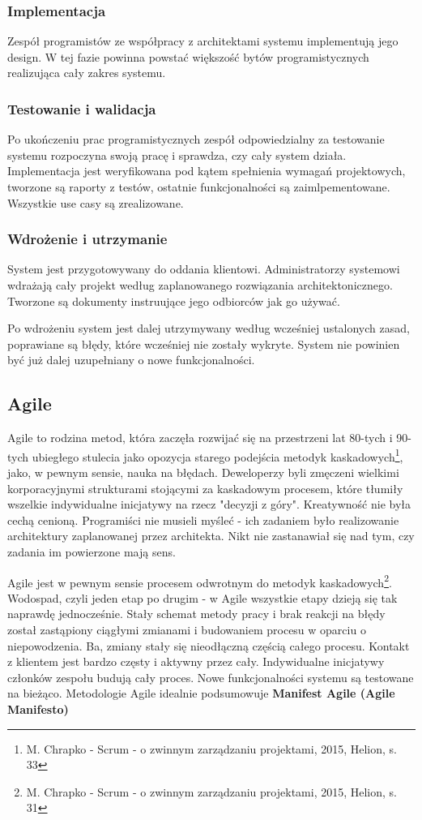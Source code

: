\documentclass{article}
\begin{document}
\subsubsection*{Implementacja}
Zespół programistów ze współpracy z architektami systemu implementują jego design. W tej fazie powinna powstać większość bytów programistycznych realizująca cały zakres systemu.

\subsubsection*{Testowanie i walidacja}
Po ukończeniu prac programistycznych zespół odpowiedzialny za testowanie systemu rozpoczyna swoją pracę i sprawdza, czy cały system działa. Implementacja jest weryfikowana pod kątem spełnienia wymagań projektowych, tworzone są raporty z testów, ostatnie funkcjonalności są zaimlpementowane. Wszystkie use casy są zrealizowane.

\subsubsection*{Wdrożenie i utrzymanie}
System jest przygotowywany do oddania klientowi. Administratorzy systemowi wdrażają cały projekt według zaplanowanego rozwiązania architektonicznego. Tworzone są dokumenty instruujące jego odbiorców jak go używać.

Po wdrożeniu system jest dalej utrzymywany według wcześniej ustalonych zasad, poprawiane są błędy, które wcześniej nie zostały wykryte. System nie powinien być już dalej uzupełniany o nowe funkcjonalności.

\subsection{Agile}
Agile to rodzina metod, która zaczęła rozwijać się na przestrzeni lat 80-tych i 90-tych ubiegłego stulecia jako opozycja starego podejścia metodyk kaskadowych\footnote{M. Chrapko - Scrum - o zwinnym zarządzaniu projektami, 2015, Helion, s. 33}, jako, w pewnym sensie, nauka na błędach. Deweloperzy byli zmęczeni wielkimi korporacyjnymi strukturami stojącymi za kaskadowym procesem, które tłumiły wszelkie indywidualne inicjatywy na rzecz "decyzji z góry". Kreatywność nie była cechą cenioną. Programiści nie musieli myśleć - ich zadaniem było realizowanie architektury zaplanowanej przez architekta. Nikt nie zastanawiał się nad tym, czy zadania im powierzone mają sens.

Agile jest w pewnym sensie procesem odwrotnym do metodyk kaskadowych\footnote{M. Chrapko - Scrum - o zwinnym zarządzaniu projektami, 2015, Helion, s. 31}. Wodospad, czyli jeden etap po drugim - w Agile wszystkie etapy dzieją się tak naprawdę jednocześnie. Stały schemat metody pracy i brak reakcji na błędy został zastąpiony ciągłymi zmianami i budowaniem procesu w oparciu o niepowodzenia. Ba, zmiany stały się nieodłączną częścią całego procesu. Kontakt z klientem jest bardzo częsty i aktywny przez cały. Indywidualne inicjatywy członków zespołu budują cały proces. Nowe funkcjonalności systemu są testowane na bieżąco. Metodologie Agile idealnie podsumowuje \textbf{Manifest Agile (Agile Manifesto)}
\end{document}
